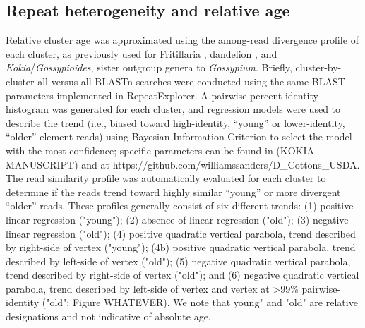 \documentclass{bmcart}
\begin{document}
\subsection*{Repeat heterogeneity and relative age}
Relative cluster age was approximated using the among-read divergence profile of each cluster, as previously used for Fritillaria \cite{Kelly2015}, dandelion \cite{Ferreira2016}, and \textit{Kokia}/\textit{Gossypioides}, sister outgroup genera to \textit{Gossypium}. Briefly, cluster-by-cluster all-versus-all BLASTn \cite{Boratyn2013, Altshul1990} searches were conducted using the same BLAST parameters implemented in RepeatExplorer. A pairwise percent identity histogram was generated for each cluster, and regression models were used to describe the trend (i.e., biased toward high-identity, “young” or lower-identity, “older” element reads) using Bayesian Information Criterion \cite{Schwarz1978} to select the model with the most confidence; specific parameters can be found in (KOKIA MANUSCRIPT) and at https://github.com/williamssanders/D\_Cottons\_USDA. The read similarity profile was automatically evaluated for each cluster to determine if the reads trend toward highly similar “young” or more divergent “older” reads. These profiles generally consist of six different trends: (1) positive linear regression ("young"); (2) absence of linear regression ("old"); (3) negative linear regression ("old"); (4) positive quadratic vertical parabola, trend described by right-side of vertex ("young"); (4b) positive quadratic vertical parabola, trend described by left-side of vertex ("old"); (5) negative quadratic vertical parabola, trend described by right-side of vertex ("old"); and (6) negative quadratic vertical parabola, trend described by left-side of vertex and vertex at >99\% pairwise-identity ("old"; Figure WHATEVER). We note that young" and "old" are relative designations and not indicative of absolute age. 


\end{document}
